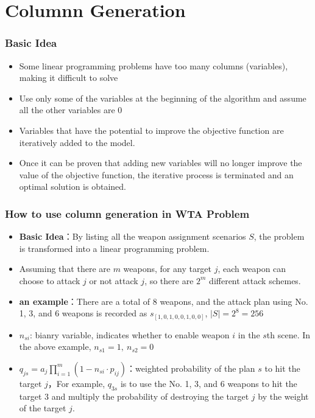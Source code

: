 \documentclass[CJK,10pt]{beamer}
\begin{document}
\section{Columnn Generation}
\begin{frame}
    \frametitle{Basic Idea}
    \begin{itemize}
        \item Some linear programming problems have too many columns (variables), making it difficult to solve
        \item Use only some of the variables at the beginning of the algorithm and assume all the other variables are 0
        \item Variables that have the potential to improve the objective function are iteratively added to the model. 
        \item Once it can be proven that adding new variables will no longer improve the value of the objective function, the iterative process is terminated and an optimal solution is obtained.
    \end{itemize}
\end{frame}

\begin{frame}
    \frametitle{How to use column generation in WTA Problem}
    \begin{itemize}
		\item \textbf{Basic Idea}：By listing all the weapon assignment scenarios $S$, the problem is transformed into a linear programming problem.
		\item Assuming that there are $m$ weapons, for any target $j$, each weapon can choose to attack $j$ or not attack $j$, so there are $2^m$ different attack schemes.
		\item \textbf{an example}：There are a total of 8 weapons, and the attack plan using No. 1, 3, and 6 weapons is recorded as $s_{[1,0,1,0,0,1,0,0]}$, $|S| = 2^8 = 256$
		\item $n_{si}$: bianry variable, indicates whether to enable weapon $i$ in the $s$th scene. In the above example, $n_{s1} = 1,\ n_{s2} = 0$
		\item $q_{js} = a_j \prod_{i = 1}^m (1 - n_{si}\cdot p_{ij})$：weighted probability of the plan $s$ to hit the target $j$，For example, $q_{3s}$ is to use the No. 1, 3, and 6 weapons to hit the target $3$ and multiply the probability of destroying the target $j$ by the weight of the target $j$.
	\end{itemize}
\end{frame}
\end{document}
